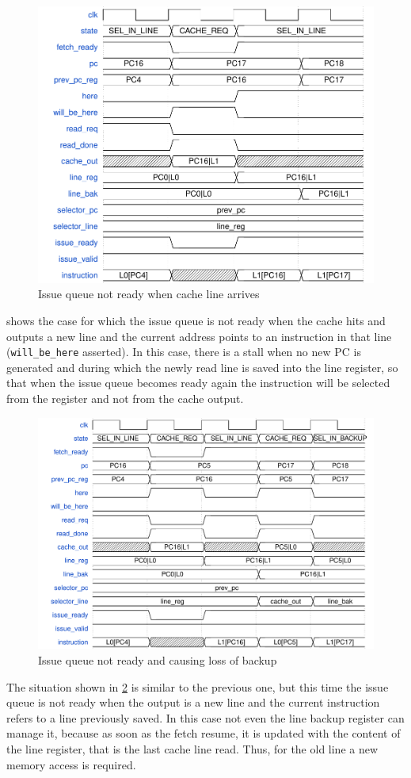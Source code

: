\pagebreak
\begin{figure}[!ht]
  \centering
  \includegraphics[width=.9\textwidth]{img/fetch05.pdf}
  \caption{Issue queue not ready when cache line arrives}
  \label{fig:fetch05}
\end{figure}
 shows the case for which the issue queue is not ready when the cache hits and outputs a new line and the current address points to an instruction in that line (\texttt{will\_be\_here} asserted). In this case, there is a stall when no new \ac{PC} is generated and during which the newly read line is saved into the line register, so that when the issue queue becomes ready again the instruction will be selected from the register and not from the cache output.

\begin{figure}[!ht]
  \centering
  \includegraphics[scale=.65]{img/fetch08.pdf}
  \caption{Issue queue not ready and causing loss of backup}
  \label{fig:fetch08}
\end{figure}
The situation shown in \cref{fig:fetch08} is similar to the previous one, but this time the issue queue is not ready when the output is a new line and the current instruction refers to a line previously saved. In this case not even the line backup register can manage it, because as soon as the fetch resume, it is updated with the content of the line register, that is the last cache line read. Thus, for the old line a new memory access is required.

